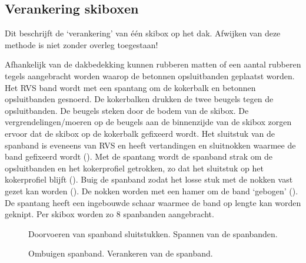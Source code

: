 \subsection{Verankering skiboxen}

Dit beschrijft de ‘verankering’ van één skibox op het dak. Afwijken van
deze methode is niet zonder overleg toegestaan!

Afhankelijk van de dakbedekking kunnen rubberen matten of een aantal
rubberen tegels aangebracht worden waarop de betonnen opsluitbanden
geplaatst worden. Het RVS band wordt met een spantang om de kokerbalk en
betonnen opsluitbanden gesnoerd. De kokerbalken drukken de twee beugels
tegen de opsluitbanden. De beugels steken door de bodem van de skibox.
De vergrendelingen/moeren op de beugels aan de binnenzijde van de skibox
zorgen ervoor dat de skibox op de kokerbalk gefixeerd wordt. Het
sluitstuk van de spanband is eveneens van RVS en heeft vertandingen en
sluitnokken waarmee de band gefixeerd wordt (). Met
de spantang wordt de spanband strak om de opsluitbanden en het
kokerprofiel getrokken, zo dat het sluitstuk op het kokerprofiel blijft
(). Buig de spanband zodat het losse stuk
met de nokken vast gezet kan worden (). De
nokken worden met een hamer om de band ‘gebogen’
(). De spantang heeft een ingebouwde
schaar waarmee de band op lengte kan worden geknipt. Per skibox worden
zo 8 spanbanden aangebracht.

\begin{figure}
    \centering
    \caption{Doorvoeren van spanband sluitstukken. Spannen van de
             spanbanden.}
\end{figure}

\begin{figure}
    \centering
    \caption{Ombuigen spanband. Verankeren van de spanband.}
\end{figure}

